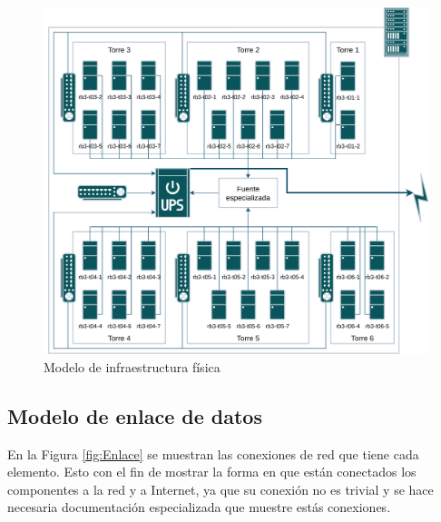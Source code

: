 \begin{figure}[H]
	\centering
	\includegraphics[scale=0.1]{tablas-images/personalizado/Diagramas HTCondor-Fisica.drawio.png}
	\caption{Modelo de infraestructura física}
    \label{fig:Fisica}
\end{figure}

\subsection{Modelo de enlace de datos}
\noindent
En la Figura \ref{fig:Enlace} se muestran las conexiones de red que tiene cada elemento. Esto con el fin de mostrar la forma en que están conectados los componentes a la red y a Internet, ya que su conexión no es trivial y se hace necesaria documentación especializada que muestre estás conexiones.

